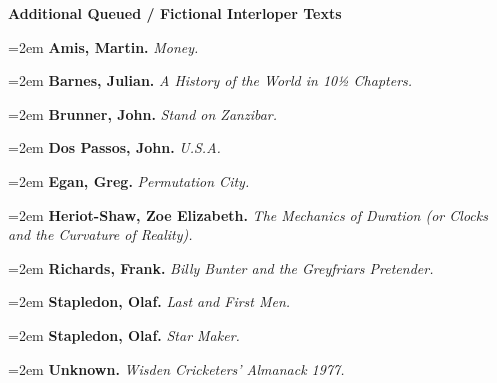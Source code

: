 \bigskip
{\bf Additional Queued / Fictional Interloper Texts} \par\smallskip

\par\noindent\hangindent=2em {\bf Amis, Martin.} {\it Money.} \par
\par\noindent\hangindent=2em {\bf Barnes, Julian.} {\it A History of the World in 10½ Chapters.} \par
\par\noindent\hangindent=2em {\bf Brunner, John.} {\it Stand on Zanzibar.} \par
\par\noindent\hangindent=2em {\bf Dos Passos, John.} {\it U.S.A.} \par
\par\noindent\hangindent=2em {\bf Egan, Greg.} {\it Permutation City.} \par
\par\noindent\hangindent=2em {\bf Heriot-Shaw, Zoe Elizabeth.} {\it The Mechanics of Duration (or Clocks and the Curvature of Reality).} \par
\par\noindent\hangindent=2em {\bf Richards, Frank.} {\it Billy Bunter and the Greyfriars Pretender.} \par
\par\noindent\hangindent=2em {\bf Stapledon, Olaf.} {\it Last and First Men.} \par
\par\noindent\hangindent=2em {\bf Stapledon, Olaf.} {\it Star Maker.} \par
\par\noindent\hangindent=2em {\bf Unknown.} {\it Wisden Cricketers' Almanack 1977.} \par

\bye
